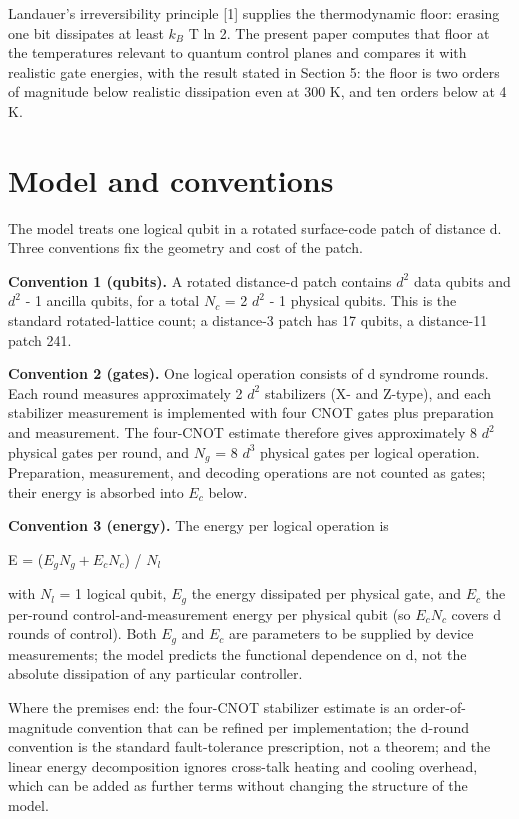 \documentclass[11pt]{article}
\begin{document}
Landauer's irreversibility principle [1] supplies the thermodynamic floor: erasing one bit dissipates at least $k_{B}$ T ln 2. The present paper computes that floor at the temperatures relevant to quantum control planes and compares it with realistic gate energies, with the result stated in Section 5: the floor is two orders of magnitude below realistic dissipation even at 300 K, and ten orders below at 4 K.

\section{Model and conventions}
The model treats one logical qubit in a rotated surface-code patch of distance d. Three conventions fix the geometry and cost of the patch.

\textbf{Convention 1 (qubits).} A rotated distance-d patch contains $d^{2}$ data qubits and $d^{2}$ - 1 ancilla qubits, for a total $N_{c}$ = 2 $d^{2}$ - 1 physical qubits. This is the standard rotated-lattice count; a distance-3 patch has 17 qubits, a distance-11 patch 241.

\textbf{Convention 2 (gates).} One logical operation consists of d syndrome rounds. Each round measures approximately 2 $d^{2}$ stabilizers (X- and Z-type), and each stabilizer measurement is implemented with four CNOT gates plus preparation and measurement. The four-CNOT estimate therefore gives approximately 8 $d^{2}$ physical gates per round, and $N_{g}$ = 8 $d^{3}$ physical gates per logical operation. Preparation, measurement, and decoding operations are not counted as gates; their energy is absorbed into $E_{c}$ below.

\textbf{Convention 3 (energy).} The energy per logical operation is

E = ($E_{g}   N_{g} + E_{c}   N_{c}$) / $N_{l}$

with $N_{l}$ = 1 logical qubit, $E_{g}$ the energy dissipated per physical gate, and $E_{c}$ the per-round control-and-measurement energy per physical qubit (so $E_{c}   N_{c}$ covers d rounds of control). Both $E_{g}$ and $E_{c}$ are parameters to be supplied by device measurements; the model predicts the functional dependence on d, not the absolute dissipation of any particular controller.

Where the premises end: the four-CNOT stabilizer estimate is an order-of-magnitude convention that can be refined per implementation; the d-round convention is the standard fault-tolerance prescription, not a theorem; and the linear energy decomposition ignores cross-talk heating and cooling overhead, which can be added as further terms without changing the structure of the model.
\end{document}
